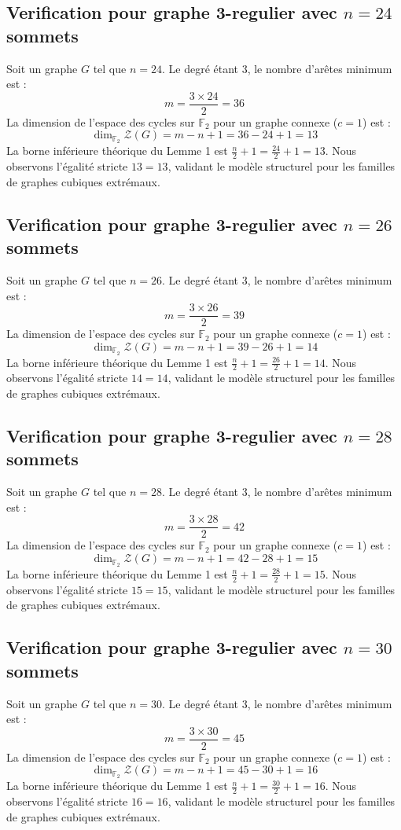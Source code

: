 \documentclass[11pt,a4paper]{article}
\begin{document}
\subsection{Verification pour graphe 3-regulier avec $n=24$ sommets}
Soit un graphe $G$ tel que $n = 24$. Le degré étant 3, le nombre d'arêtes minimum est :
$$ m = \frac{3 \times 24}{2} = 36 $$
La dimension de l'espace des cycles sur $\mathbb{F}_2$ pour un graphe connexe ($c=1$) est :
$$ \dim_{\mathbb{F}_2} \mathcal{Z}(G) = m - n + 1 = 36 - 24 + 1 = 13 $$
La borne inférieure théorique du Lemme 1 est $\frac{n}{2} + 1 = \frac{24}{2} + 1 = 13$.
Nous observons l'égalité stricte $13 = 13$, validant le modèle structurel pour les familles de graphes cubiques extrémaux.

\subsection{Verification pour graphe 3-regulier avec $n=26$ sommets}
Soit un graphe $G$ tel que $n = 26$. Le degré étant 3, le nombre d'arêtes minimum est :
$$ m = \frac{3 \times 26}{2} = 39 $$
La dimension de l'espace des cycles sur $\mathbb{F}_2$ pour un graphe connexe ($c=1$) est :
$$ \dim_{\mathbb{F}_2} \mathcal{Z}(G) = m - n + 1 = 39 - 26 + 1 = 14 $$
La borne inférieure théorique du Lemme 1 est $\frac{n}{2} + 1 = \frac{26}{2} + 1 = 14$.
Nous observons l'égalité stricte $14 = 14$, validant le modèle structurel pour les familles de graphes cubiques extrémaux.

\subsection{Verification pour graphe 3-regulier avec $n=28$ sommets}
Soit un graphe $G$ tel que $n = 28$. Le degré étant 3, le nombre d'arêtes minimum est :
$$ m = \frac{3 \times 28}{2} = 42 $$
La dimension de l'espace des cycles sur $\mathbb{F}_2$ pour un graphe connexe ($c=1$) est :
$$ \dim_{\mathbb{F}_2} \mathcal{Z}(G) = m - n + 1 = 42 - 28 + 1 = 15 $$
La borne inférieure théorique du Lemme 1 est $\frac{n}{2} + 1 = \frac{28}{2} + 1 = 15$.
Nous observons l'égalité stricte $15 = 15$, validant le modèle structurel pour les familles de graphes cubiques extrémaux.

\subsection{Verification pour graphe 3-regulier avec $n=30$ sommets}
Soit un graphe $G$ tel que $n = 30$. Le degré étant 3, le nombre d'arêtes minimum est :
$$ m = \frac{3 \times 30}{2} = 45 $$
La dimension de l'espace des cycles sur $\mathbb{F}_2$ pour un graphe connexe ($c=1$) est :
$$ \dim_{\mathbb{F}_2} \mathcal{Z}(G) = m - n + 1 = 45 - 30 + 1 = 16 $$
La borne inférieure théorique du Lemme 1 est $\frac{n}{2} + 1 = \frac{30}{2} + 1 = 16$.
Nous observons l'égalité stricte $16 = 16$, validant le modèle structurel pour les familles de graphes cubiques extrémaux.
\end{document}
